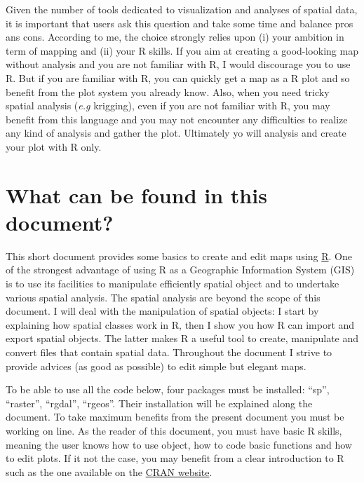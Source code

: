\documentclass[]{report}
\begin{document}
Given the number of tools dedicated to visualization and analyses of
spatial data, it is important that users ask this question and take some
time and balance pros ans cons. According to me, the choice strongly
relies upon (i) your ambition in term of mapping and (ii) your R skills.
If you aim at creating a good-looking map without analysis and you are
not familiar with R, I would discourage you to use R. But if you are
familiar with R, you can quickly get a map as a R plot and so benefit
from the plot system you already know. Also, when you need tricky
spatial analysis (\emph{e.g} krigging), even if you are not familiar
with R, you may benefit from this language and you may not encounter any
difficulties to realize any kind of analysis and gather the plot.
Ultimately yo will analysis and create your plot with R only.

\hypertarget{what-can-be-found-in-this-document}{%
\section{What can be found in this
document?}\label{what-can-be-found-in-this-document}}

This short document provides some basics to create and edit maps using
\href{https://cran.r-project.org}{R}. One of the strongest advantage of
using R as a Geographic Information System (GIS) is to use its
facilities to manipulate efficiently spatial object and to undertake
various spatial analysis. The spatial analysis are beyond the scope of
this document. I will deal with the manipulation of spatial objects: I
start by explaining how spatial classes work in R, then I show you how R
can import and export spatial objects. The latter makes R a useful tool
to create, manipulate and convert files that contain spatial data.
Throughout the document I strive to provide advices (as good as
possible) to edit simple but elegant maps.

To be able to use all the code below, four packages must be installed:
``sp'', ``raster'', ``rgdal'', ``rgeos''. Their installation will be
explained along the document. To take maximum benefits from the present
document you must be working on line. As the reader of this document,
you must have basic R skills, meaning the user knows how to use object,
how to code basic functions and how to edit plots. If it not the case,
you may benefit from a clear introduction to R such as the one available
on the
\href{http://cran.r-project.org/doc/manuals/r-release/R-intro.html}{CRAN
website}.
\end{document}
